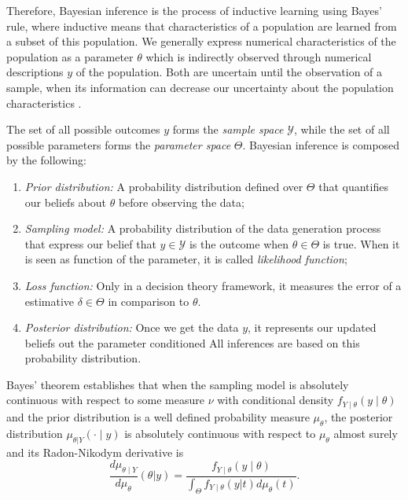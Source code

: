 Therefore, Bayesian inference is the process of inductive learning using
Bayes' rule, where inductive means that characteristics of a population are 
learned from a subset of this population. We generally
express numerical characteristics of the population as a parameter $\theta$ which is
indirectly observed through numerical descriptions $y$ of the population. Both are
uncertain until the observation of a sample, when its information can decrease
our uncertainty about the population characteristics \cite[p. 1-2]{hoff2009first}.

The set of all possible outcomes $y$ forms the {\em sample space}
$\mathcal{Y}$, while the set of all possible parameters forms the {\em
parameter space} $\Theta$. Bayesian inference is composed by the following: 

\begin{enumerate}[label=(\alph*)]
    \item {\em Prior distribution:} A probability distribution defined over 
    $\Theta$ that quantifies our beliefs about $\theta$ before observing the data;
    \item {\em Sampling model: } A probability distribution of the data generation process
    that express our belief that $y \in \mathcal{Y}$ is the outcome when
    $\theta \in \Theta$ is true. When it is seen as function of the parameter,
    it is called {\em likelihood function};
    \item {\em Loss function:} Only in a decision theory framework, it
    measures the error of a estimative $\delta \in \Theta$ in comparison to
    $\theta$. 
    \item {\em Posterior distribution:} Once we get the data $y$, it
    represents our updated beliefs out the parameter conditioned All
    inferences are based on this probability distribution.
\end{enumerate} 

Bayes' theorem establishes that when the sampling model is absolutely
continuous with respect to some measure $\nu$ with conditional density
$f_{Y\mid \theta}(y\mid\theta)$ and the prior distribution is a
well defined probability measure $\mu_{\theta}$, the posterior distribution
$\mu_{\theta|Y}(\cdot\mid y)$ is
absolutely continuous with respect to $\mu_{\theta}$ almost surely and its
Radon-Nikodym derivative is \cite[p. 16]{schervish2012theory}
\begin{equation}
  \label{eq:bayes-update-measure}
  \frac{d\mu_{\theta\mid Y}}{d\mu_{\theta}}(\theta|y) = \frac{f_{Y\mid \theta}(y\mid \theta)}{\int_{\Theta} f_{Y\mid\theta}(y|t)d\mu_{\theta}(t)}.  
\end{equation}

